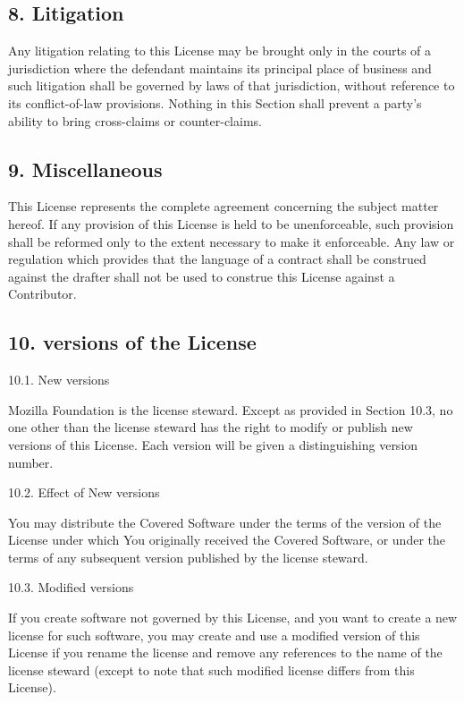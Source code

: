 \documentclass[letterpaper,10pt,english]{sphinxmanual}
\begin{document}
\subsection{8. Litigation}
\label{\detokenize{warranty:litigation}}
Any litigation relating to this License may be brought only in the courts of a jurisdiction where the defendant maintains its principal place of business and such litigation shall be governed by laws of that jurisdiction, without reference to its conflict-of-law provisions. Nothing in this Section shall prevent a party’s ability to bring cross-claims or counter-claims.


\subsection{9. Miscellaneous}
\label{\detokenize{warranty:miscellaneous}}
This License represents the complete agreement concerning the subject matter hereof. If any provision of this License is held to be unenforceable, such provision shall be reformed only to the extent necessary to make it enforceable. Any law or regulation which provides that the language of a contract shall be construed against the drafter shall not be used to construe this License against a Contributor.


\subsection{10. versions of the License}
\label{\detokenize{warranty:versions-of-the-license}}
10.1. New versions

Mozilla Foundation is the license steward. Except as provided in Section
10.3, no one other than the license steward has the right to modify or
publish new versions of this License. Each version will be given a
distinguishing version number.

10.2. Effect of New versions

You may distribute the Covered Software under the terms of the version
of the License under which You originally received the Covered Software,
or under the terms of any subsequent version published by the license
steward.

10.3. Modified versions

If you create software not governed by this License, and you want to
create a new license for such software, you may create and use a
modified version of this License if you rename the license and remove
any references to the name of the license steward (except to note that
such modified license differs from this License).
\end{document}

